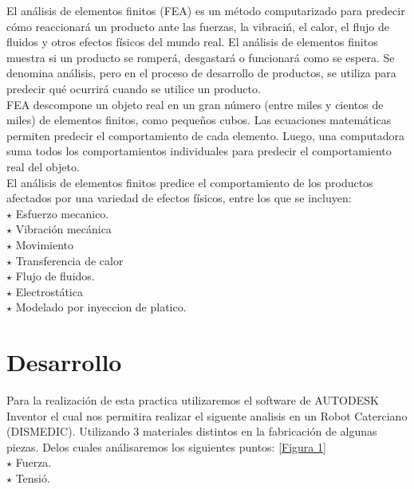 \documentclass[letter,openright,12pt,spanish]{report}
\begin{document}
El an\'alisis de elementos finitos (FEA) es un m\'etodo computarizado para predecir c\'omo reaccionará un producto ante las fuerzas, la vibraci\'n, el calor, el flujo de fluidos y otros efectos f\'isicos del mundo real. El análisis de elementos finitos muestra si un producto se romper\'a, desgastar\'a o funcionar\'a como se espera. Se denomina an\'alisis, pero en el proceso de desarrollo de productos, se utiliza para predecir qué ocurrir\'a cuando se utilice un producto.\\
FEA descompone un objeto real en un gran número (entre miles y cientos de miles) de elementos finitos, como pequeños cubos. Las ecuaciones matemáticas permiten predecir el comportamiento de cada elemento. Luego, una computadora suma todos los comportamientos individuales para predecir el comportamiento real del objeto.\\
El an\'alisis de elementos finitos predice el comportamiento de los productos afectados por una variedad de efectos f\'isicos, entre los que se incluyen:\\

$\star$ Esfuerzo mecanico.\\

$\star$ Vibraci\'on mec\'anica\\

$\star$ Movimiento\\

$\star$ Transferencia de calor\\

$\star$ Flujo de fluidos.\\

$\star$ Electrost\'atica\\

$\star$ Modelado por inyeccion de platico.

\section{Desarrollo}

Para la realizaci\'on de esta practica utilizaremos el software de AUTODESK Inventor el cual nos permitira realizar el siguente analisis en un Robot Caterciano (DISMEDIC). Utilizando 3 materiales distintos en la fabricaci\'on de algunas piezas. Delos cuales an\'alisaremos los siguientes puntos: \ref{Figura 1}\\

$\star$ Fuerza.\\

$\star$ Tensi\'o.\\
\end{document}
